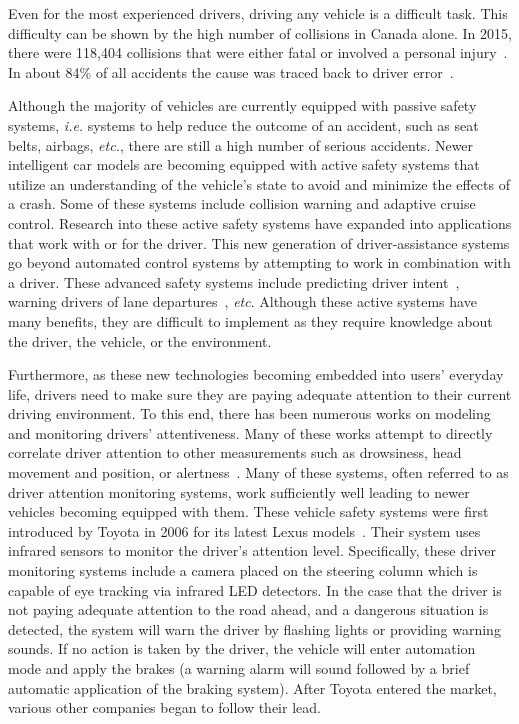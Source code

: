 Even for the most experienced drivers, driving any vehicle is a difficult task. This difficulty can be shown by the high number of collisions in Canada alone. In 2015, there were 118,404 collisions that were either fatal or involved a personal injury~\cite{TrafficReport}. In about 84\% of all accidents the cause was traced back to driver error~\cite{CognitiveModel}. 

Although the majority of vehicles are currently equipped with passive safety systems, \emph{i.e.} systems to help reduce the outcome of an accident, such as seat belts, airbags, \emph{etc.}, there are still a high number of serious accidents. Newer intelligent car models are becoming equipped with active safety systems that utilize an understanding of the vehicle's state to avoid and minimize the effects of a crash. Some of these systems include collision warning and adaptive cruise control. Research into these active safety systems have expanded into applications that work with or for the driver. This new generation of driver-assistance systems go beyond automated control systems by attempting to work in combination with a driver. These advanced safety systems include predicting driver intent~\cite{InferringDriverIntent:2004}, warning drivers of lane departures~\cite{LaneDeparture:2002}, \emph{etc}. Although these active systems have many benefits, they are difficult to implement as they require knowledge about the driver, the vehicle, or the environment.

Furthermore, as these new technologies becoming embedded into users' everyday life, drivers need to make sure they are paying adequate attention to their current driving environment. To this end, there has been numerous works on modeling and monitoring drivers' attentiveness. Many of these works attempt to directly correlate driver attention to other measurements such as drowsiness, head movement and position, or alertness~\cite{VisualCuesDriverVigilance:2001, DrowsinessWarning:2008, DAISY:1994, Drowsiness:2012}. Many of these systems, often referred to as driver attention monitoring systems, work sufficiently well leading to newer vehicles becoming equipped with them. These vehicle safety systems were first introduced by Toyota in 2006 for its latest Lexus models~\cite{Toyota:2015}. Their system uses infrared sensors to monitor the driver's attention level. Specifically, these driver monitoring systems include a camera placed on the steering column which is capable of eye tracking via infrared LED detectors. In the case that the driver is not paying adequate attention to the road ahead, and a dangerous situation is detected, the system will warn the driver by flashing lights or providing warning sounds. If no action is taken by the driver, the vehicle will enter automation mode and apply the brakes (a warning alarm will sound followed by a brief automatic application of the braking system). After Toyota entered the market, various other companies began to follow their lead.

